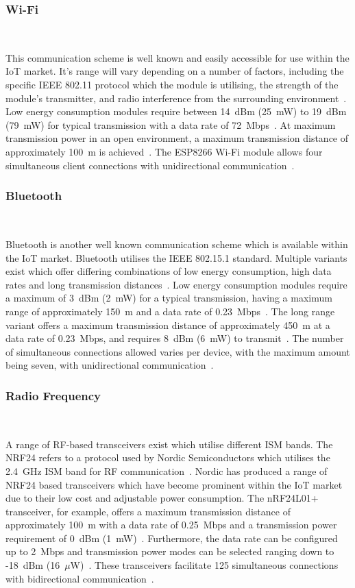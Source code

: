 \documentclass[10pt,twocolumn]{witseiepaper}
\begin{document}
		\subsubsection{Wi-Fi} $   $
		
			This communication scheme is well known and easily accessible for use within the IoT market. It's range will vary depending on a number of factors, including the specific IEEE 802.11 protocol which the module is utilising, the strength of the module's transmitter, and radio interference from the surrounding environment~\cite{802.11}. Low energy consumption modules require between 14~dBm (25~mW) to 19~dBm (79~mW) for typical transmission with a data rate of 72~Mbps~\cite{esp12e}. At maximum transmission power in an open environment, a maximum transmission distance of approximately 100~m is achieved~\cite{esp12e}. The ESP8266 \mbox{Wi-Fi} module allows four simultaneous client connections with unidirectional communication~\cite{esp12e}.

		\subsubsection{Bluetooth} $   $
		
			Bluetooth is another well known communication scheme which is available within the IoT market. Bluetooth utilises the IEEE 802.15.1 standard. Multiple variants exist which offer differing combinations of low energy consumption, high data rates and long transmission distances~\cite{802.15.2}. Low energy consumption modules require a maximum of 3~dBm (2~mW) for a typical transmission, having a maximum range of approximately 150~m and a data rate of 0.23~Mbps~\cite{BLE112}. The long range variant offers a maximum transmission distance of approximately 450~m at a data rate of 0.23~Mbps, and requires 8~dBm (6~mW) to transmit~\cite{BLE112LR}. The number of simultaneous connections allowed varies per device, with the maximum amount being seven, with unidirectional communication~\cite{bluetooth-users}.

		\subsubsection{Radio Frequency} $   $
		
			A range of RF-based transceivers exist which utilise different ISM bands. The NRF24 refers to a protocol used by Nordic Semiconductors which utilises the 2.4~GHz ISM band for RF communication~\cite{nrf24}. Nordic has produced a range of NRF24 based transceivers which have become prominent within the IoT market due to their low cost and adjustable power consumption. The nRF24L01+ transceiver, for example, offers a maximum transmission distance of approximately 100~m with a data rate of 0.25~Mbps and a transmission power requirement of 0~dBm (1~mW)~\cite{nrf24}. Furthermore, the data rate can be configured up to 2~Mbps and transmission power modes can be selected ranging down to -18~dBm (16~$\mu$W)~\cite{nrf24}. These transceivers facilitate 125 simultaneous connections with bidirectional communication~\cite{nrf24}.
			
\end{document}
